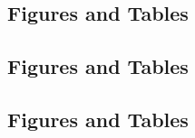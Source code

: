 \begin{landscape}
\section{Figures and Tables}


\end{landscape}


\begin{landscape}
\section{Figures and Tables}


\end{landscape}


\begin{landscape}
\section{Figures and Tables}


\end{landscape}

